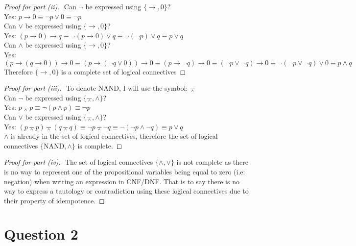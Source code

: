 \documentclass[12pt]{fphw}
\begin{document}
\begin{proof}[Proof for part (ii)] $ $ \newline
  Can $\neg$ be expressed using $\{\to, 0\}$? \\
  Yes: $p \to 0 \equiv \neg p \vee 0 \equiv \neg p$ \\
  Can $\vee$ be expressed using $\{\to, 0\}$? \\
  Yes: $(p \to 0) \to q \equiv \neg (p \to 0) \vee q \equiv \neg (\neg p ) \vee q \equiv p \vee q$ \\
  Can $\wedge$ be expressed using $\{\to, 0\}$? \\
  Yes: $(p \to (q \to 0)) \to 0 \equiv (p \to (\neg q \vee 0)) \to 0 \equiv (p \to \neg q) \to 0 \equiv (\neg p \vee \neg q) \to 0 \equiv \neg(\neg p \vee \neg q) \vee 0 \equiv p \wedge q$ \\
  Therefore $\{\to, 0\}$ is a complete set of logical connectives
\end{proof}

\begin{proof}[Proof for part (iii)] $ $ \newline
  To denote NAND, I will use the symbol: $\barwedge$ \\
  Can $\neg$ be expressed using $\{\barwedge, \wedge\}$? \\
  Yes: $p \barwedge p \equiv \neg(p \wedge p) \equiv \neg p$ \\
  Can $\vee$ be expressed using $\{\barwedge, \wedge\}$? \\
  Yes: $(p \barwedge p) \barwedge (q \barwedge q) \equiv \neg p \barwedge \neg q \equiv \neg(\neg p \wedge \neg q) \equiv p \vee q$ \\
  $\wedge$ is already in the set of logical connectives, therefore the set of logical connectives $\{\text{NAND}, \wedge\}$ is complete.
\end{proof}

\begin{proof}[Proof for part (iv)] $ $ \newline
  The set of logical connectives $\{\wedge, \vee\}$ is not complete as there is no way to represent one of the propositional variables being equal to zero (i.e: negation) when writing an expression in CNF/DNF. That is to say there is no way to express a tautology or contradiction using these logical connectives due to their property of idempotence.
\end{proof}
\section*{Question 2}
\end{document}
